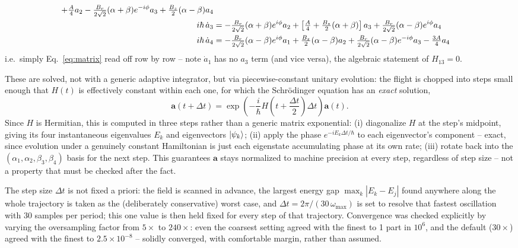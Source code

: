 \documentclass[11pt,a4paper]{article}
\begin{document}
\begin{description}
\begin{align}
        + \tfrac{A}{4}a_2
        - \tfrac{B_r}{2\sqrt2}(\alpha+\beta)e^{-i\phi}a_3
        + \tfrac{B_z}{2}(\alpha-\beta)a_4 \notag\\
    i\hbar\,\dot a_3 &= -\tfrac{B_r}{2\sqrt2}(\alpha+\beta)e^{i\phi}a_2
        + \left[\tfrac{A}{4}+\tfrac{B_z}{2}(\alpha+\beta)\right]a_3
        + \tfrac{B_r}{2\sqrt2}(\alpha-\beta)e^{i\phi}a_4 \notag\\
    i\hbar\,\dot a_4 &= -\tfrac{B_r}{2\sqrt2}(\alpha-\beta)e^{i\phi}a_1
        + \tfrac{B_z}{2}(\alpha-\beta)a_2
        + \tfrac{B_r}{2\sqrt2}(\alpha-\beta)e^{-i\phi}a_3
        - \tfrac{3A}{4}a_4
    \label{eq:fode-explicit}
\end{align}
i.e.\ simply Eq.~\eqref{eq:matrix} read off row by row -- note $\dot a_1$
has no $a_3$ term (and vice versa), the algebraic statement of $H_{13}=0$.

These are solved, not with a generic adaptive integrator, but via
piecewise-constant unitary evolution: the flight is chopped into steps
small enough that $H(t)$ is effectively constant within each one, for which
the Schr\"odinger equation has an \emph{exact} solution,
\begin{equation}
    \mathbf{a}(t+\Delta t)=\exp\!\left(-\frac{i}{\hbar}H\!\left(t+\frac{\Delta t}{2}\right)\Delta t\right)\mathbf{a}(t).
    \label{eq:propagator-step}
\end{equation}
Since $H$ is Hermitian, this is computed in three steps rather than a
generic matrix exponential: (i) diagonalize $H$ at the step's midpoint,
giving its four instantaneous eigenvalues $E_k$ and eigenvectors
$\ket{\psi_k}$; (ii) apply the phase $e^{-iE_k\Delta t/\hbar}$ to each
eigenvector's component -- exact, since evolution under a genuinely
constant Hamiltonian is just each eigenstate accumulating phase at its own
rate; (iii) rotate back into the $(\alpha_1,\alpha_2,\beta_3,\beta_4)$
basis for the next step. This guarantees $\mathbf a$ stays normalized to
machine precision at every step, regardless of step size -- not a property
that must be checked after the fact.

The step size $\Delta t$ is not fixed a priori: the field is scanned in
advance, the largest energy gap $\max_k|E_k-E_j|$ found anywhere along the
whole trajectory is taken as the (deliberately conservative) worst case,
and $\Delta t=2\pi/(30\,\omega_{\max})$ is set to resolve that fastest
oscillation with 30 samples per period; this one value is then held fixed
for every step of that trajectory. Convergence was checked explicitly by
varying the oversampling factor from $5\times$ to $240\times$: even the
coarsest setting agreed with the finest to 1 part in $10^6$, and the
default ($30\times$) agreed with the finest to $2.5\times10^{-8}$ -- solidly
converged, with comfortable margin, rather than assumed.


\end{description}
\end{document}
